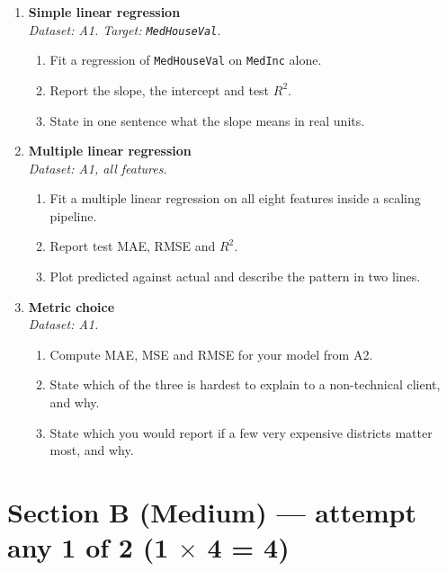 \documentclass[11pt,a4paper]{article}
\begin{document}
\begin{enumerate}[label=\textbf{A\arabic*.}, leftmargin=*]

  \item \textbf{Simple linear regression} \\
    \emph{Dataset: A1. Target: \texttt{MedHouseVal}.}
    \begin{enumerate}[label=(\alph*), leftmargin=*]
      \item Fit a regression of \texttt{MedHouseVal} on \texttt{MedInc} alone.
      \item Report the slope, the intercept and test $R^2$.
      \item State in one sentence what the slope means in real units.
    \end{enumerate}

  \item \textbf{Multiple linear regression} \\
    \emph{Dataset: A1, all features.}
    \begin{enumerate}[label=(\alph*), leftmargin=*]
      \item Fit a multiple linear regression on all eight features inside a scaling pipeline.
      \item Report test MAE, RMSE and $R^2$.
      \item Plot predicted against actual and describe the pattern in two lines.
    \end{enumerate}

  \item \textbf{Metric choice} \\
    \emph{Dataset: A1.}
    \begin{enumerate}[label=(\alph*), leftmargin=*]
      \item Compute MAE, MSE and RMSE for your model from A2.
      \item State which of the three is hardest to explain to a non-technical client, and why.
      \item State which you would report if a few very expensive districts matter most, and why.
    \end{enumerate}

\end{enumerate}

\section*{Section B (Medium) --- attempt any 1 of 2 \quad (1 $\times$ 4 = 4)}
\end{document}
